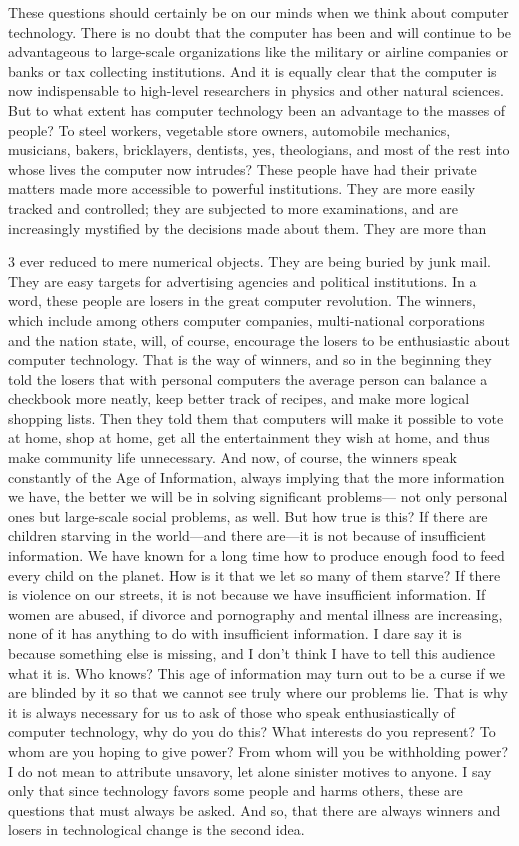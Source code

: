 These questions should certainly be on our minds when we think about computer technology. There is no
doubt that the computer has been and will continue to be advantageous to large-scale organizations like the
military or airline companies or banks or tax collecting institutions. And it is equally clear that the
computer is now indispensable to high-level researchers in physics and other natural sciences. But to what
extent has computer technology been an advantage to the masses of people? To steel workers, vegetable
store owners, automobile mechanics, musicians, bakers, bricklayers, dentists, yes, theologians, and most of
the rest into whose lives the computer now intrudes? These people have had their private matters made
more accessible to powerful institutions. They are more easily tracked and controlled; they are subjected to
more examinations, and are increasingly mystified by the decisions made about them. They are more than 


3
ever reduced to mere numerical objects. They are being buried by junk mail. They are easy targets for
advertising agencies and political institutions.
In a word, these people are losers in the great computer revolution. The winners, which include among
others computer companies, multi-national corporations and the nation state, will, of course, encourage the
losers to be enthusiastic about computer technology. That is the way of winners, and so in the beginning
they told the losers that with personal computers the average person can balance a checkbook more neatly,
keep better track of recipes, and make more logical shopping lists. Then they told them that computers will
make it possible to vote at home, shop at home, get all the entertainment they wish at home, and thus make
community life unnecessary. And now, of course, the winners speak constantly of the Age of Information,
always implying that the more information we have, the better we will be in solving significant problems—
not only personal ones but large-scale social problems, as well. But how true is this? If there are children
starving in the world—and there are—it is not because of insufficient information. We have known for a
long time how to produce enough food to feed every child on the planet. How is it that we let so many of
them starve? If there is violence on our streets, it is not because we have insufficient information. If women
are abused, if divorce and pornography and mental illness are increasing, none of it has anything to do with
insufficient information. I dare say it is because something else is missing, and I don’t think I have to tell
this audience what it is. Who knows? This age of information may turn out to be a curse if we are blinded
by it so that we cannot see truly where our problems lie. That is why it is always necessary for us to ask of
those who speak enthusiastically of computer technology, why do you do this? What interests do you
represent? To whom are you hoping to give power? From whom will you be withholding power?
I do not mean to attribute unsavory, let alone sinister motives to anyone. I say only that since technology
favors some people and harms others, these are questions that must always be asked. And so, that there are
always winners and losers in technological change is the second idea.


